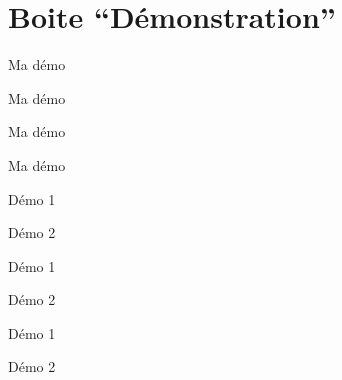\documentclass[a4paper,12pt]{article}
\begin{document}
	\section{Boite ``Démonstration''}

\begin{code}%
\begin{demonstration}
	Ma démo
\end{demonstration}
\end{code}

\begin{demonstration}
	Ma démo
\end{demonstration}%

\begin{code}%
\begin{demonstration*}
	Ma démo
\end{demonstration*}
\end{code}

\begin{demonstration*}
	Ma démo
\end{demonstration*}%

\begin{code}%
\begin{demonstrations}
	\item Démo 1
	\item Démo 2
\end{demonstrations}
\end{code}

\begin{demonstrations}
	\item Démo 1
	\item Démo 2
\end{demonstrations}%

\begin{code}%
\begin{demonstrations*}
	\item Démo 1
	\item Démo 2
\end{demonstrations*}
\end{code}
\end{document}
